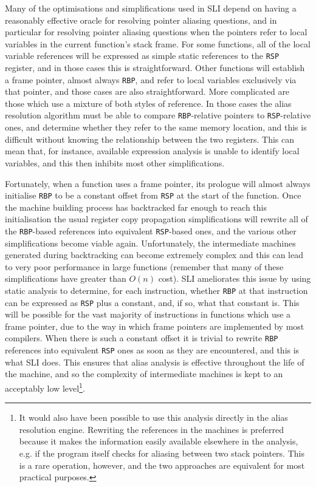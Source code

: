\documentclass[12pt,a4paper]{book}
\begin{document}
Many of the optimisations and simplifications used in SLI depend on having a reasonably effective oracle for resolving pointer aliasing questions, and in particular for resolving pointer aliasing questions when the pointers refer to local variables in the current function's stack frame.
For some functions, all of the local variable references will be expressed as simple static references to the \verb|RSP| register, and in those cases this is straightforward.
Other functions will establish a frame pointer, almost always \verb|RBP|, and refer to local variables exclusively via that pointer, and those cases are also straightforward.
More complicated are those which use a mixture of both styles of reference.
In those cases the alias resolution algorithm must be able to compare \verb|RBP|-relative pointers to \verb|RSP|-relative ones, and determine whether they refer to the same memory location, and this is difficult without knowing the relationship between the two registers.
This can mean that, for instance, available expression analysis is unable to identify local variables, and this then inhibits most other simplifications.

Fortunately, when a function uses a frame pointer, its prologue will almost always initialise \verb|RBP| to be a constant offset from \verb|RSP| at the start of the function.
Once the machine building process has backtracked far enough to reach this initialisation the usual register copy propagation simplifications will rewrite all of the \verb|RBP|-based references into equivalent \verb|RSP|-based ones, and the various other simplifications become viable again.
Unfortunately, the intermediate machines generated during backtracking can become extremely complex and this can lead to very poor performance in large functions (remember that many of these simplifications have greater than $O(n)$ cost).
SLI ameliorates this issue by using static analysis to determine, for each instruction, whether \verb|RBP| at that instruction can be expressed as \verb|RSP| plus a constant, and, if so, what that constant is.
This will be possible for the vast majority of instructions in functions which use a frame pointer, due to the way in which frame pointers are implemented by most compilers.
When there is such a constant offset it is trivial to rewrite \verb|RBP| references into equivalent \verb|RSP| ones as soon as they are encountered, and this is what SLI does.
This ensures that alias analysis is effective throughout the life of the machine, and so the complexity of intermediate machines is kept to an acceptably low level\footnote{It would also have been possible to use this analysis directly in the alias resolution engine.  Rewriting the references in the machines is preferred because it makes the information easily available elsewhere in the analysis, e.g. if the program itself checks for aliasing between two stack pointers.  This is a rare operation, however, and the two approaches are equivalent for most practical purposes.}.
\end{document}

